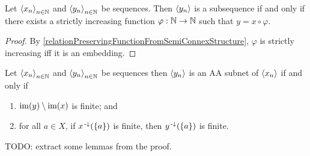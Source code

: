 \begin{lemma}
Let $\left\langle x_n \right\rangle_{n\in \mathbb{N}}$ and $\left\langle y_n \right\rangle_{n\in \mathbb{N}}$ be sequences. Then $\left\langle y_n \right\rangle$ is a subsequence \textup{if and only if} there exists a strictly increasing function $\varphi: \mathbb{N}\to \mathbb{N}$ such that $y = x\circ \varphi$.
\end{lemma}
\begin{proof}
By \ref{relationPreservingFunctionFromSemiConnexStructure}, $\varphi$ is strictly increasing iff it is an embedding.
\end{proof}

\begin{lemma} \label{sequenceAAsubnet}
Let $\left\langle x_n \right\rangle_{n\in \mathbb{N}}$ and $\left\langle y_n \right\rangle_{n\in \mathbb{N}}$ be sequences then $\left\langle y_n \right\rangle$ is an AA subnet of $\left\langle x_n \right\rangle$ \textup{if and only if}
\begin{enumerate}
\item $\operatorname{im}(y)\setminus \operatorname{im}(x)$ is finite; and
\item for all $a\in X$, if $x^{\text{\hspace{0.15em}-}\downarrow}(\{a\})$ is finite, then $y^{\text{\hspace{0.15em}-}\downarrow}(\{a\})$ is finite.
\end{enumerate}
\end{lemma}
TODO: extract some lemmas from the proof.
